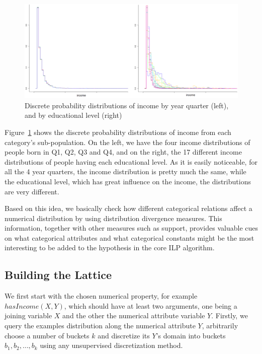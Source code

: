 \begin{figure}[h!]
\caption{Discrete probability distributions of income by year quarter (left), and by educational level (right)}
\begin{center}
  \includegraphics[width=1\linewidth]{./Figures/birthquarter-education.png}
\end{center}
\label{fig:income-education}
\end{figure}

Figure~\ref{fig:income-education} shows the discrete probability distributions of income from each category's
sub-population. On the left, we have the four income distributions of people born in Q1, Q2, Q3 and Q4, and on the
right, the 17 different income distributions of people having each educational level. As it is easily noticeable, for
all the 4 year quarters, the income distribution is pretty much the same, while the educational level, which has great
influence on the income, the distributions are very different.

Based on this idea, we basically check how different categorical relations affect a numerical distribution by using
distribution divergence measures. This information, together with other measures such as support, provides valuable
cues on what categorical attributes and what categorical constants might be the most interesting to be added to the
hypothesis in the core ILP algorithm.


\subsection{Building the Lattice}

We first start with the chosen numerical property, for example $hasIncome(X,Y)$, which should have at least two
arguments, one being a joining variable $X$ and the other the numerical attribute variable $Y$. Firstly, we query the
examples distribution along the numerical attribute $Y$, arbitrarily choose a number of buckets $k$ and discretize
its $Y$'s domain into buckets $b_1, b_2, \dots, b_k$ using any unsupervised discretization method. 

